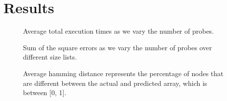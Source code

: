 \section{Results} \label{sec:results}


\begin{figure}[h]
  \center
  \caption{Average total execution times as we vary the number of probes.}
  \label{fig:nallruntime}
\end{figure}

\begin{figure}[h]
  \center
  \caption{Sum of the square errors as we vary the number of probes
    over different size lists.}
  \label{fig:nallsee}
\end{figure}

\begin{figure}[h]
  \center
  \caption{Average hamming distance represents the percentage of nodes
    that are different between the actual and predicted array, which
    is between [0, 1].}
  \label{fig:hamming}
\end{figure}
